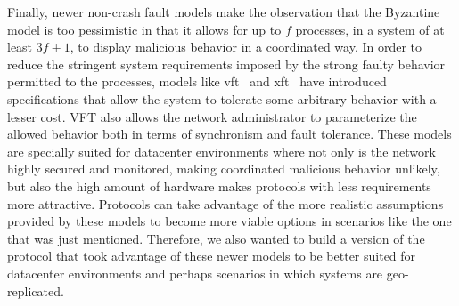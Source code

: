 Finally, newer non-crash fault models make the observation that the Byzantine model is too pessimistic in that it allows for up to $f$ processes, in a system of at least $3f+1$, to display malicious behavior in a coordinated way. In order to reduce the stringent system requirements imposed by the strong faulty behavior permitted to the processes, models like \acrshort{vft}~\cite{Porto2015} and \acrshort{xft}~\cite{Liu2015} have introduced specifications that allow the system to tolerate some arbitrary behavior with a lesser cost. VFT also allows the network administrator to parameterize the allowed behavior both in terms of synchronism and fault tolerance. These models are specially suited for datacenter environments where not only is the network highly secured and monitored, making coordinated malicious behavior unlikely, but also the high amount of hardware makes protocols with less requirements more attractive. Protocols can take advantage of the more realistic assumptions provided by these models to become more viable options in scenarios like the one that was just mentioned. Therefore, we also wanted to build a version of the protocol that took advantage of these newer models to be better suited for datacenter environments and perhaps scenarios in which systems are geo-replicated. \par

